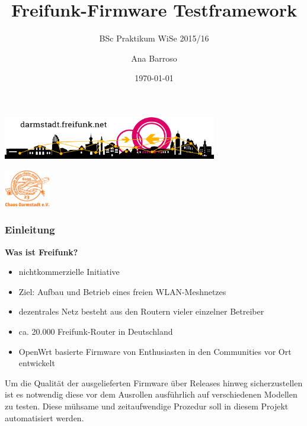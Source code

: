 \documentclass[accentcolor=tud6b,colorbacktitle,inverttitle,landscape,german,presentation,t]{tudbeamer}
\begin{document}
	
	\title[Freifunk-Firmware Testframework]{Freifunk-Firmware Testframework}
	\subtitle{BSc Praktikum WiSe 2015/16}
	
	\author{Ana Barroso}
	
	
	\date{\today}
	
	\begin{titleframe}
		\begin{center}
			\vspace{1.5cm}
			\includegraphics[width=0.7\textwidth]{images/logo-skyline}
			\vspace{1.4cm}
		\end{center}
			\flushright
			\includegraphics[width=0.15\textwidth]{images/cda}
	\end{titleframe}
	
	\begin{frame}
		\frametitle{Einleitung}
		\vfill
		\textbf{Was ist Freifunk?}
		\vfill
		\begin{itemize}
			\item nichtkommerzielle Initiative
			\item Ziel: Aufbau und Betrieb eines freien WLAN-Meshnetzes
			\item dezentrales Netz besteht aus den Routern vieler einzelner Betreiber
			\item ca. 20.000 Freifunk-Router in Deutschland
			\item OpenWrt basierte Firmware von Enthusiasten in den Communities vor Ort entwickelt
		\end{itemize}
		\vfill
		\pause
		Um die Qualität der ausgelieferten Firmware über Releases hinweg sicherzustellen ist es notwendig diese vor dem Ausrollen ausführlich auf verschiedenen Modellen zu testen. Diese mühsame und zeitaufwendige Prozedur soll in diesem Projekt automatisiert werden.
	\end{frame}
	
\end{document}
